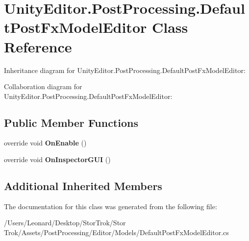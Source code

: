 \hypertarget{class_unity_editor_1_1_post_processing_1_1_default_post_fx_model_editor}{}\section{Unity\+Editor.\+Post\+Processing.\+Default\+Post\+Fx\+Model\+Editor Class Reference}
\label{class_unity_editor_1_1_post_processing_1_1_default_post_fx_model_editor}


Inheritance diagram for Unity\+Editor.\+Post\+Processing.\+Default\+Post\+Fx\+Model\+Editor\+:


Collaboration diagram for Unity\+Editor.\+Post\+Processing.\+Default\+Post\+Fx\+Model\+Editor\+:
\subsection*{Public Member Functions}
\begin{DoxyCompactItemize}
\item 
\mbox{\label{class_unity_editor_1_1_post_processing_1_1_default_post_fx_model_editor_a68eb49101de308934dcd63dbe26b4704}} 
override void {\bfseries On\+Enable} ()
\item 
\mbox{\label{class_unity_editor_1_1_post_processing_1_1_default_post_fx_model_editor_a2f43028e13c460b608aab5c846551016}} 
override void {\bfseries On\+Inspector\+G\+UI} ()
\end{DoxyCompactItemize}
\subsection*{Additional Inherited Members}


The documentation for this class was generated from the following file\+:\begin{DoxyCompactItemize}
\item 
/\+Users/\+Leonard/\+Desktop/\+Stor\+Trok/\+Stor Trok/\+Assets/\+Post\+Processing/\+Editor/\+Models/Default\+Post\+Fx\+Model\+Editor.\+cs\end{DoxyCompactItemize}
